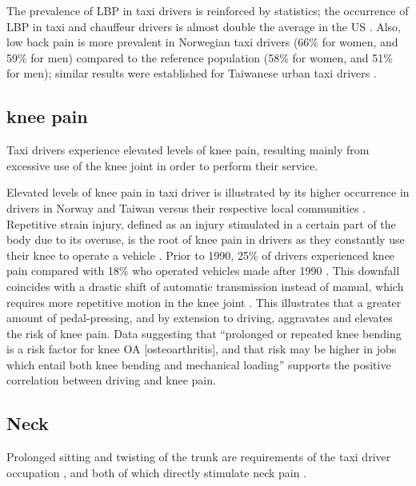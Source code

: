 \documentclass[11pt]{article}
\begin{document}
The prevalence of LBP in taxi drivers is reinforced by statistics; the occurrence of LBP 
in taxi and chauffeur drivers is almost double the average in the US \cite{68}. Also, low 
back pain is more prevalent in Norwegian taxi drivers (66\% for women, and 59\% for men) 
compared to the reference population (58\% for women, and 51\% for men); similar results 
were established for Taiwanese urban taxi drivers \cite{Question?}.

 
\subsection{knee pain}
Taxi drivers experience elevated levels of knee pain, resulting mainly from excessive use 
of the knee joint in order to perform their service. 

Elevated levels of knee pain in taxi driver is illustrated by its higher occurrence in drivers 
in Norway and Taiwan versus their respective local communities \cite{KneePain}. Repetitive strain 
injury, defined as an injury stimulated in a certain part of the body due to its overuse, is the 
root of knee pain in drivers \cite{RSI} as they constantly use their knee to operate a vehicle 
\cite{KneePain}. Prior to 1990, 25\% of drivers experienced knee pain compared with 18\% who 
operated vehicles made after 1990 \cite{KneePain}. This downfall coincides with a drastic shift of 
automatic transmission instead of manual, which requires more repetitive motion in the knee joint 
\cite{KneePain}. This illustrates that a greater amount of pedal-pressing, and by extension to 
driving, aggravates and elevates the risk of knee pain. Data suggesting that “prolonged or repeated 
knee bending is a risk factor for knee OA [osteoarthritis], and that risk may be higher in jobs which 
entail both knee bending and mechanical loading” \cite{Osteoarthritis} supports the positive correlation 
between driving and knee pain.



\subsection{Neck}
Prolonged sitting and twisting of the trunk are requirements of the taxi driver occupation \cite{neck}, 
and both of which directly stimulate neck pain \cite{neck}. 
\end{document}

